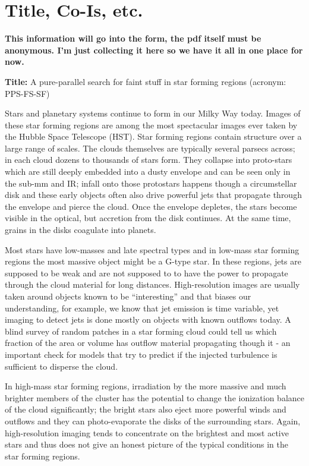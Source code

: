 \documentclass[12pt]{article}
\begin{document}
\section{Title, Co-Is, etc.}
\textbf{This information will go into the form, the pdf itself must be anonymous. I'm just collecting it here so we have it all in one place for now.}

\textbf{Title:} A pure-parallel search for faint stuff in star forming regions (acronym: PPS-FS-SF)

\pagebreak
%
%
\justification          %
Stars and planetary systems continue to form in our Milky Way today. Images of these star forming regions are among the most spectacular images ever taken by the Hubble Space Telescope (HST). Star forming regions contain structure over a large range of scales. The clouds themselves are typically several parsecs across; in each cloud dozens to thousands of stars form. They collapse into proto-stars which are still deeply embedded into a dusty envelope and can be seen only in the sub-mm and IR; infall onto those protostars happens though a circumstellar disk and these early objects often also drive powerful jets that propagate through the envelope and pierce the cloud. Once the envelope depletes, the stars become visible in the optical, but accretion from the disk continues. At the same time, grains in the disks coagulate into planets. 

Most stars have low-masses and late spectral types and in low-mass star forming regions the most massive object might be a G-type star. In these regions, jets are supposed to be weak and are not supposed to to have the power to propagate through the cloud material for long distances. High-resolution images are usually taken around objects known to be ``interesting'' and that biases our understanding, for example, we know that jet emission is time variable, yet imaging to detect jets is done mostly on objects with known outflows today. A blind survey of random patches in a star forming cloud could tell us which fraction of the area or volume has outflow material propagating though it - an important check for models that try to predict if the injected turbulence is sufficient to disperse the cloud.

In high-mass star forming regions, irradiation by the more massive and much brighter members of the cluster has the potential to change the ionization balance of the cloud significantly; the bright stars also eject more powerful winds and outflows and they can photo-evaporate the disks of the surrounding stars. Again, high-resolution imaging tends to concentrate on the brightest and most active stars and thus does not give an honest picture of the typical conditions in the star forming regions.
\end{document}
